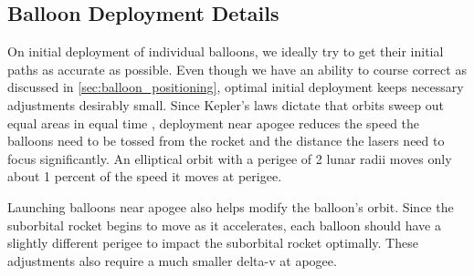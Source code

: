 \documentclass{article}
\begin{document}
\subsection{Balloon Deployment Details}
On initial deployment of individual balloons, we ideally try to get their initial paths as accurate as possible.   Even though we have an ability to course correct as discussed in \autoref{sec:balloon_positioning}, optimal initial deployment keeps necessary adjustments desirably small.   Since Kepler's laws dictate that orbits sweep out equal areas in equal time \cite{keplers_laws}, deployment near apogee reduces the speed the balloons need to be tossed from the rocket and the distance the lasers need to focus significantly.      An elliptical orbit with a perigee of 2 lunar radii moves only about 1 percent of the speed it moves at perigee.   

Launching balloons near apogee also helps modify the balloon's orbit.   Since the suborbital rocket begins to move as it accelerates, each balloon should have a slightly different perigee to impact the suborbital rocket optimally.   These adjustments also require a much smaller delta-v at apogee.

  
  
\end{document}
